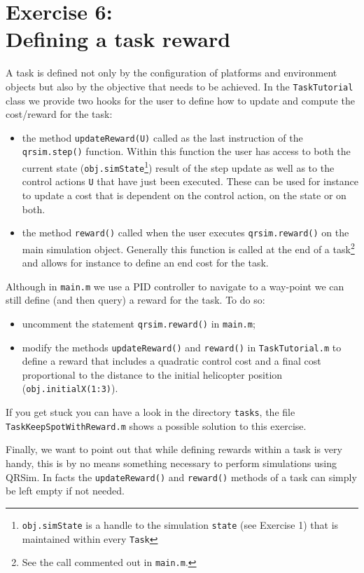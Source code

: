 \documentclass[a4paper,11pt]{article}
\begin{document}
\section*{Exercise 6:\\Defining a task reward}

A task is defined not only by the configuration of platforms and environment objects but also by the objective that needs to be achieved.
In the \texttt{TaskTutorial} class we provide two hooks for the user to define how to update and compute the cost/reward for the task:
\begin{itemize}
 \item the method \texttt{updateReward(U)} called as the last instruction of the \texttt{qrsim.step()} function. Within this function the user has access to both the current state (\texttt{obj.simState}\footnote{\texttt{obj.simState} is a handle to the simulation \texttt{state} (see Exercise 1) that is maintained within every \texttt{Task}}) result of the step update as well as to the control actions \texttt{U} that have just been executed. These can be used for instance to update a cost that is dependent on the control action, on the state or on both. 

 \item the method \texttt{reward()} called when the user executes \texttt{qrsim.reward()} on the main simulation object. Generally this function is called at the end of a task\footnote{See the call commented out in \texttt{main.m}.} and allows for instance to define an end cost for the task.
\end{itemize}
  
Although in \texttt{main.m} we use a PID controller to navigate to a way-point we can still define (and then query) a reward for the task. To do so:
\begin{itemize}
 \item uncomment the statement \texttt{qrsim.reward()} in \texttt{main.m};
 \item modify the methods \texttt{updateReward()} and \texttt{reward()} in \texttt{TaskTutorial.m} to define a reward that includes a quadratic control cost and a final cost proportional to the distance to the initial helicopter position (\texttt{obj.initialX(1:3)}).
\end{itemize}
If you get stuck you can have a look in the directory \texttt{tasks}, the file \texttt{TaskKeepSpotWithReward.m} shows a possible solution to this exercise.

Finally, we want to point out that while defining rewards within a task is very handy, this is by no means something necessary to perform simulations using QRSim. In facts the \texttt{updateReward()} and \texttt{reward()} methods of a task can simply be left empty if not needed.
\end{document}
